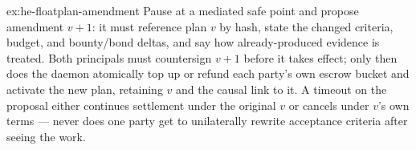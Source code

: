 \documentclass[11pt,a4paper]{article}
\theoremstyle{definition}
\theoremstyle{definition}
\theoremstyle{remark}
\begin{document}
\begin{pdsolution}{ex:he-floatplan-amendment}
Pause at a mediated safe point and propose amendment $v{+}1$: it must
reference plan $v$ by hash, state the changed criteria, budget, and bounty/bond
deltas, and say how already-produced evidence is treated. Both principals must
countersign $v{+}1$ before it takes effect; only then does the daemon atomically
top up or refund each party's own escrow bucket and activate the new plan,
retaining $v$ and the causal link to it. A timeout on the proposal either
continues settlement under the original $v$ or cancels under $v$'s own terms ---
never does one party get to unilaterally rewrite acceptance criteria after seeing
the work.
\end{pdsolution}

\end{document}
